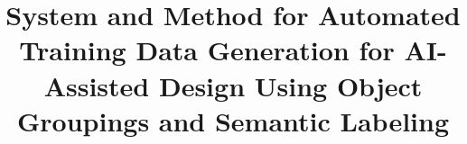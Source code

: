 \documentclass{article}
\title{System and Method for Automated Training Data Generation for AI-Assisted Design Using Object Groupings and Semantic Labeling}
\begin{document}
\begin{abstract}


\end{abstract}
\end{document}
